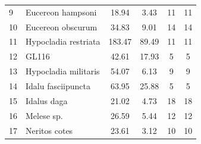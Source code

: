 \documentclass[12pt,a4paper]{article}
\begin{document}
\begin{table}[h]
\begin{tabular}{llcccc}
		9            & Eucereon hampsoni            & 18.94                                                & 3.43                                            & 11                                                        & 11                                                         \\
		10           & Eucereon obscurum            & 34.83                                                & 9.01                                            & 14                                                        & 14                                                         \\
		11           & Hypocladia restriata                        & 183.47                                               & 89.49                                           & 11                                                        & 11                                                         \\
		12           & GL116                        & 42.61                                                & 17.93                                           & 5                                                         & 5                                                          \\
		13           & Hypocladia militaris         & 54.07                                                & 6.13                                            & 9                                                         & 9                                                          \\
		14           & Idalu fasciipuncta           & 63.95                                                & 25.88                                           & 5                                                         & 5                                                          \\
		15           & Idalus daga                & 21.02                                                & 4.73                                            & 18                                                        & 18                                                         \\
		16           & Melese sp.             & 26.59                                                & 5.44                                            & 12                                                        & 12                                                         \\
		17           & Neritos cotes               & 23.61                                                & 3.12                                            & 10                                                        & 10                                                         \\

\end{tabular}
\end{table}
\end{document}
